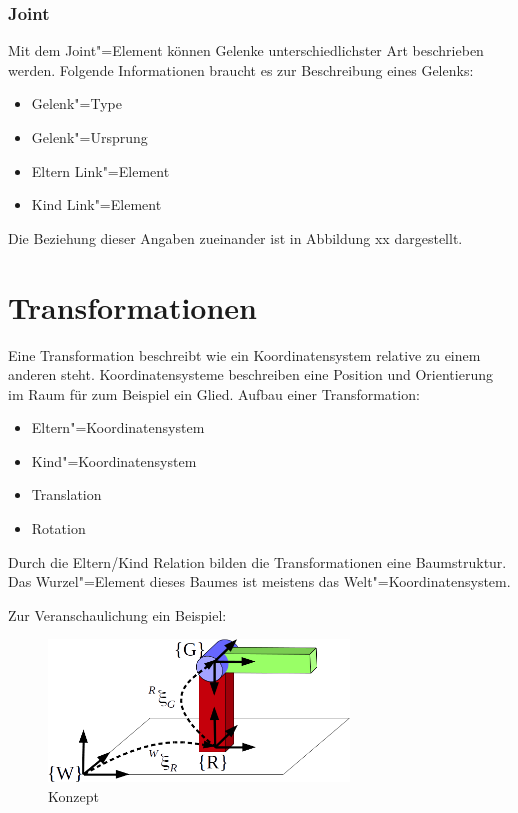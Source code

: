 \subsubsection*{Joint}
Mit dem Joint"=Element können Gelenke unterschiedlichster Art beschrieben werden.
Folgende Informationen braucht es zur Beschreibung eines Gelenks:
\begin{itemize}
\item Gelenk"=Type
\item Gelenk"=Ursprung
\item Eltern Link"=Element
\item Kind Link"=Element
\end{itemize}
Die Beziehung dieser Angaben  zueinander ist in Abbildung xx dargestellt.


\section{Transformationen} %
Eine Transformation beschreibt wie ein Koordinatensystem relative zu einem anderen steht.
Koordinatensysteme beschreiben eine Position und Orientierung im Raum für zum Beispiel ein Glied.
Aufbau einer Transformation:
\begin{itemize}
\item Eltern"=Koordinatensystem
\item Kind"=Koordinatensystem
\item Translation
\item Rotation
\end{itemize}

Durch die Eltern/Kind Relation bilden die Transformationen eine Baumstruktur.
Das Wurzel"=Element dieses Baumes ist meistens das Welt"=Koordinatensystem.


Zur Veranschaulichung ein Beispiel:
\begin{figure}[ht!]
	\centering
	\includegraphics[width=8cm]{images/Transformation.png}
	\caption{Konzept}
	\label{Ab:konzept}
\end{figure}


